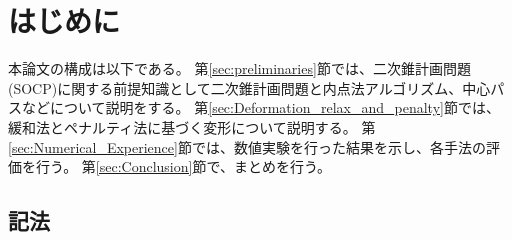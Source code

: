 \documentclass[11pt,a4paper,dvipdfmx,titlepage,uplatex]{jsarticle}
\title{{\large 令和5年度　学士論文}\\ \vskip\baselineskip
時間制約付きcarrier vehicle routing問題に対する\\二次錐計画問題を用いた解法}
\author{東京工業大学　情報理工学院　数理・計算科学系\\
学籍番号　19B31048\\
脇田康平\\
指導教員 山下 真 教授\\
}
\date{2023年2月27日}
\theoremstyle{mystyle}
\newcommand{\0}{\mathbf{0}}
\begin{document}
\maketitle

\tableofcontents
\clearpage

\section{はじめに}\label{sec:introduction}

本論文の構成は以下である。
第\ref{sec:preliminaries}節では、二次錐計画問題(SOCP)に関する前提知識として二次錐計画問題と内点法アルゴリズム、中心パスなどについて説明をする。
第\ref{sec:Deformation_relax_and_penalty}節では、緩和法とペナルティ法に基づく変形について説明する。
第\ref{sec:Numerical_Experience}節では、数値実験を行った結果を示し、各手法の評価を行う。
第\ref{sec:Conclusion}節で、まとめを行う。

\subsection{記法}\label{sec:notation}
\end{document}

